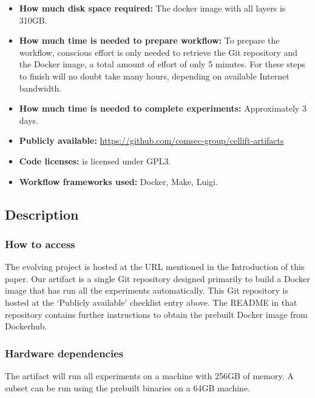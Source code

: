 \documentclass[letterpaper,twocolumn,10pt]{article}
\begin{document}
{\begin{itemize}
  \item {\bf How much disk space required: } The docker image with all layers is 310GB.
  \item {\bf How much time is needed to prepare workflow: } To prepare the workflow, conscious effort is only needed to retrieve the Git repository and the Docker image, a total amount of effort of only 5 minutes. For these steps to finish will no doubt take many hours, depending on available Internet bandwidth.
  \item {\bf How much time is needed to complete experiments: } Approximately 3 days. 
  \item {\bf Publicly available: } \url{https://github.com/comsec-group/cellift-artifacts} 
  \item {\bf Code licenses: } \ourname is licensed under GPL3. 
  \item {\bf Workflow frameworks used: } Docker, Make, Luigi. 
\end{itemize}

\subsection{Description}


\subsubsection{How to access}

The evolving project is hosted at the URL mentioned in the Introduction
of this paper. Our artifact is a single Git repository designed primarily to
build a Docker image that has run all the experiments automatically. This
Git repository is hosted at the `Publicly available' checklist entry above.
The README in that repository contains further instructions to obtain the
prebuilt Docker image from Dockerhub.

\subsubsection{Hardware dependencies}

The artifact will run all experiments on a machine with 256GB of memory. A subset can be run using the prebuilt binaries on a 64GB machine.

}
\end{document}
